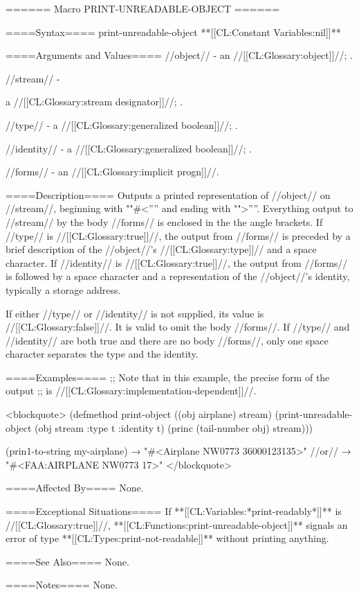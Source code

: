 ====== Macro PRINT-UNREADABLE-OBJECT ======

====Syntax====
\DefmacWithValues print-unreadable-object { } {**[[CL:Constant Variables:nil]]**}

====Arguments and Values====
//object// - an //[[CL:Glossary:object]]//; \eval.

//stream// -

a //[[CL:Glossary:stream designator]]//; \eval.

//type// - a //[[CL:Glossary:generalized boolean]]//; \eval.

//identity// - a //[[CL:Glossary:generalized boolean]]//; \eval.

//forms// - an //[[CL:Glossary:implicit progn]]//.

====Description====
Outputs a printed representation of //object// on //stream//, beginning with ""#<'''' and ending with "">''''. Everything output to //stream// by the body //forms// is enclosed in the the angle brackets. If //type// is //[[CL:Glossary:true]]//, the output from //forms// is preceded by a brief description of the //object//'s //[[CL:Glossary:type]]// and a space character. If //identity// is //[[CL:Glossary:true]]//, the output from //forms// is followed by a space character and a representation of the //object//'s identity, typically a storage address.

If either //type// or //identity// is not supplied, its value is //[[CL:Glossary:false]]//. It is valid to omit the body //forms//. If //type// and //identity// are both true and there are no body //forms//, only one space character separates the type and the identity.

====Examples====
;; Note that in this example, the precise form of the output ;; is //[[CL:Glossary:implementation-dependent]]//.

<blockquote> (defmethod print-object ((obj airplane) stream) (print-unreadable-object (obj stream :type t :identity t) (princ (tail-number obj) stream)))

(prin1-to-string my-airplane) → "#<Airplane NW0773 36000123135>" //or// → "#<FAA:AIRPLANE NW0773 17>" </blockquote>

====Affected By====
None.

====Exceptional Situations====
If **[[CL:Variables:*print-readably*]]** is //[[CL:Glossary:true]]//, **[[CL:Functions:print-unreadable-object]]** signals an error of type **[[CL:Types:print-not-readable]]** without printing anything.

====See Also====
None.

====Notes====
None.

